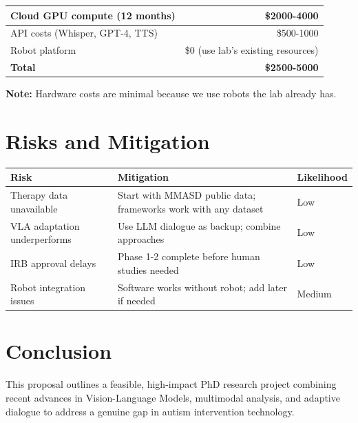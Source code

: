 \documentclass[12pt, a4paper]{article}
\begin{document}
\begin{table}[h]
\centering
\begin{tabular}{|l|r|}
\hline
Cloud GPU compute (12 months) & \$2000-4000 \\
\hline
API costs (Whisper, GPT-4, TTS) & \$500-1000 \\
\hline
Robot platform & \$0 (use lab's existing resources) \\
\hline
\textbf{Total} & \textbf{\$2500-5000} \\
\hline
\end{tabular}
\end{table}

\textbf{Note:} Hardware costs are minimal because we use robots the lab already has.

\section{Risks and Mitigation}

\begin{table}[h]
\centering
\begin{tabular}{|p{2.5cm}|p{3.5cm}|p{1.5cm}|}
\hline
\textbf{Risk} & \textbf{Mitigation} & \textbf{Likelihood} \\
\hline
Therapy data unavailable & Start with MMASD public data; frameworks work with any dataset & Low \\
\hline
VLA adaptation underperforms & Use LLM dialogue as backup; combine approaches & Low \\
\hline
IRB approval delays & Phase 1-2 complete before human studies needed & Low \\
\hline
Robot integration issues & Software works without robot; add later if needed & Medium \\
\hline
\end{tabular}
\end{table}

\section{Conclusion}

This proposal outlines a feasible, high-impact PhD research project combining recent advances in Vision-Language Models, multimodal analysis, and adaptive dialogue to address a genuine gap in autism intervention technology.
\end{document}
